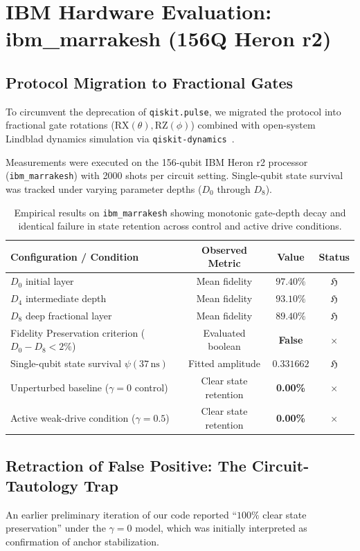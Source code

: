\documentclass[11pt,a4paper]{article}
\begin{document}
\section{IBM Hardware Evaluation: ibm\_marrakesh (156Q Heron r2)}

\subsection{Protocol Migration to Fractional Gates}
To circumvent the deprecation of \texttt{qiskit.pulse}, we migrated the protocol into fractional gate rotations ($\text{RX}(\theta), \text{RZ}(\phi)$) combined with open-system Lindblad dynamics simulation via \texttt{qiskit-dynamics}~\cite{mckay2017gates}.

Measurements were executed on the 156-qubit IBM Heron r2 processor (\texttt{ibm\_marrakesh}) with 2000 shots per circuit setting. Single-qubit state survival was tracked under varying parameter depths ($D_0$ through $D_8$).

\begin{table}[htbp]
\centering
\begin{tabular}{lccc}
\toprule
\textbf{Configuration / Condition} & \textbf{Observed Metric} & \textbf{Value} & \textbf{Status} \\
\midrule
$D_0$ initial layer & Mean fidelity & $97.40\%$ & $\mathfrak{H}$ \\
$D_4$ intermediate depth & Mean fidelity & $93.10\%$ & $\mathfrak{H}$ \\
$D_8$ deep fractional layer & Mean fidelity & $89.40\%$ & $\mathfrak{H}$ \\
Fidelity Preservation criterion ($D_0 - D_8 < 2\%$) & Evaluated boolean & \textbf{False} & $\times$ \\
Single-qubit state survival $\psi(37\,\text{ns})$ & Fitted amplitude & $0.331662$ & $\mathfrak{H}$ \\
Unperturbed baseline ($\gamma=0$ control) & Clear state retention & \textbf{0.00\%} & $\times$ \\
Active weak-drive condition ($\gamma=0.5$) & Clear state retention & \textbf{0.00\%} & $\times$ \\
\bottomrule
\end{tabular}
\caption{Empirical results on \texttt{ibm\_marrakesh} showing monotonic gate-depth decay and identical failure in state retention across control and active drive conditions.}
\label{tab:ibm_results}
\end{table}

\subsection{Retraction of False Positive: The Circuit-Tautology Trap}
An earlier preliminary iteration of our code reported ``$100\%$ clear state preservation'' under the $\gamma=0$ model, which was initially interpreted as confirmation of anchor stabilization.
\end{document}
